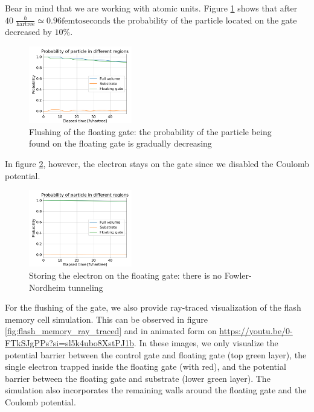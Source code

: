 Bear in mind that we are working with atomic units.
Figure \ref{fig:flash_flush_plot} shows that after $40\;\frac{\hbar}{\text{hartree}} \simeq 0.96 \text{femtoseconds}$ the probability of the particle located on the gate decreased by $10\%$.
\begin{figure}[hbt!]
	\centering
	\includegraphics[width=0.4\textwidth]{figures/flash_flush.png}
	\caption{Flushing of the floating gate: the probability of the particle being found on the floating gate is gradually decreasing}
	\label{fig:flash_flush_plot}
\end{figure}
In figure \ref{fig:flash_keep}, however, the electron stays on the gate since we disabled the Coulomb potential.
\begin{figure}[hbt!]
	\centering
	\includegraphics[width=0.4\textwidth]{figures/flash_keep.png}
	\caption{Storing the electron on the floating gate: there is no Fowler-Nordheim tunneling}
	\label{fig:flash_keep}
\end{figure}
For the flushing of the gate, we also provide ray-traced visualization of the flash memory cell simulation.
This can be observed in figure \ref{fig:flash_memory_ray_traced} and in animated form on \url{https://youtu.be/0-FTkSJgPPs?si=sl5k4ubo8XstPJ1b}.
In these images, we only visualize the potential barrier between the control gate and floating gate (top green layer), the single electron trapped inside the floating gate (with red), and the potential barrier between the floating gate and substrate (lower green layer).
The simulation also incorporates the remaining walls around the floating gate and the Coulomb potential.

